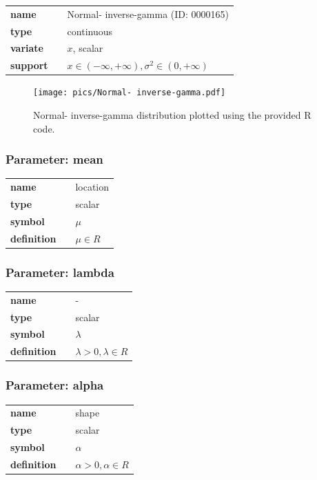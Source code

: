 \documentclass{article}
\begin{document}
  \bigskip 

\begin{tabular}{p{2cm}cl}
\textbf{name} & & Normal- inverse-gamma (ID: 0000165)\\ 
 
\textbf{type} & & continuous \\ 

\textbf{variate} & & $x$, scalar \\ 

\textbf{support} & & $x \in (-\infty,+\infty), \sigma^2 \in (0,+\infty)$
\end{tabular}

\begin{figure}[ht!]
\centering
  \texttt{[image: pics/Normal- inverse-gamma.pdf]}
 \caption{Normal- inverse-gamma distribution plotted using the provided R code.}
 \label{fig:Normal- inverse-gamma}
\end{figure}

\subsubsection*{Parameter: mean}

\noindent\begin{tabular}{p{2cm}cl}
\textbf{name} & & location \\
\textbf{type} & & scalar \\
\textbf{symbol} & & $\mu$  \\
\textbf{definition} & & $\mu \in  R$
\end{tabular}
\subsubsection*{Parameter: lambda}

\noindent\begin{tabular}{p{2cm}cl}
\textbf{name} & & - \\
\textbf{type} & & scalar \\
\textbf{symbol} & & $\lambda$  \\
\textbf{definition} & & $\lambda > 0, \lambda \in  R$
\end{tabular}
\subsubsection*{Parameter: alpha}

\noindent\begin{tabular}{p{2cm}cl}
\textbf{name} & & shape \\
\textbf{type} & & scalar \\
\textbf{symbol} & & $\alpha$  \\
\textbf{definition} & & $\alpha > 0, \alpha \in  R$
\end{tabular}
\end{document}
